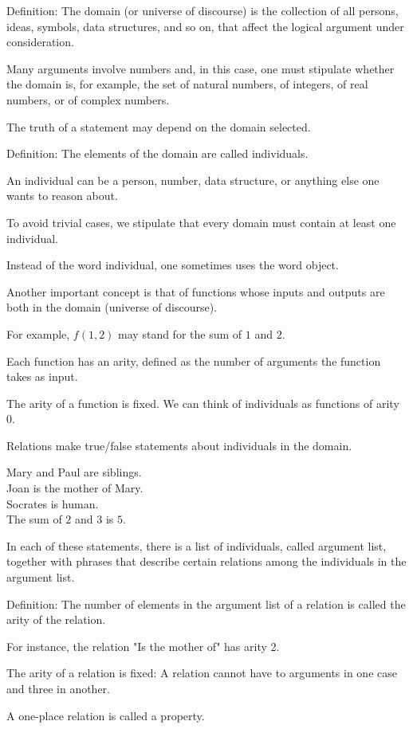 \documentclass{article}
\begin{document}
Definition: The domain (or universe of discourse) is the collection of all persons, ideas, symbols, data structures, and so on, that affect the logical argument under consideration.

Many arguments involve numbers and, in this case, one must stipulate whether the domain is, for example, the set of natural numbers, of integers, of real numbers, or of complex numbers.

The truth of a statement may depend on the domain selected.

Definition: The elements of the domain are called individuals.

An individual can be a person, number, data structure, or anything else one wants to reason about.

To avoid trivial cases, we stipulate that every domain must contain at least one individual.

Instead of the word individual, one sometimes uses the word object.


Another important concept is that of functions whose inputs and outputs are both in the domain (universe of discourse).

For example, $f(1,2)$ may stand for the sum of $1$ and $2$.

Each function has an arity, defined as the number of arguments the function takes as input.

The arity of a function is fixed. We can think of individuals as functions of arity $0$.

Relations make true/false statements about individuals in the domain.

Mary and Paul are siblings.\\
Joan is the mother of Mary.\\
Socrates is human.\\
The sum of $2$ and $3$ is $5$.

In each of these statements, there is a list of individuals, called argument list, together with phrases that describe certain relations among the individuals in the argument list.


Definition: The number of elements in the argument list of a relation is called the arity of the relation.

For instance, the relation "Is the mother of" has arity 2.

The arity of a relation is fixed: A relation cannot have to arguments in one case and three in another.

A one-place relation is called a property. 
\end{document}
